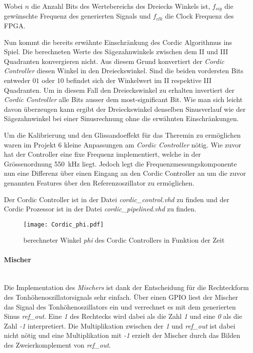 Wobei \(n\) die Anzahl Bits des Wertebereichs des Dreiecks Winkels ist, \(f_{sig}\) die gewünschte Frequenz des generierten Signals und \(f_{clk}\) die Clock Frequenz des FPGA.

Nun kommt die bereits erwähnte Einschränkung des Cordic Algorithmus ins Spiel. Die berechneten Werte des Sägezahnwinkels zwischen dem II und III Quadranten konvergieren nicht. Aus diesem Grund konvertiert der \textit{Cordic Controller} diesen Winkel in den Dreieckswinkel. Sind die beiden vordersten Bits entweder \(01\) oder \(10\) befindet sich der Winkelwert im II respektive III Quadranten. Um in diesem Fall den Dreieckswinkel zu erhalten invertiert der \textit{Cordic Controller} alle Bits ausser dem most-significant Bit. Wie man sich leicht davon überzeugen kann ergibt der Dreieckswinkel denselben Sinusverlauf wie der Sägezahnwinkel bei einer Sinusrechnung ohne die erwähnten Einschränkungen. \cite{Cordic}

Um die Kalibrierung und den Glissandoeffekt für das Theremin zu ermöglichen waren im Projekt 6 kleine Anpassungen am \textit{Cordic Controller} nötig. Wie zuvor hat der Controller eine fixe Frequenz implementiert, welche in der Grössenordnung \SI{550}{kHz} liegt. Jedoch legt die Frequenzmessungskomponente nun eine Differenz über einen Eingang an den Cordic Controller an um die zuvor genannten Features über den Referenzoszillator zu ermöglichen.

Der Cordic Controller ist in der Datei \textit{cordic\_control.vhd} zu finden und der Cordic Prozessor ist in der Datei \textit{cordic\_pipelined.vhd} zu finden.


\begin{figure}[t]
	\centering
	\texttt{[image: Cordic\_phi.pdf]}
	\caption{berechneter Winkel \textit{phi} des Cordic Controllers in Funktion der Zeit} 
	\label{img:Cordic_phi}
\end{figure}  


\paragraph{Mischer}\mbox{}\\

Die Implementation des \textit{Mischers} ist dank der Entscheidung für die Rechteckform des Tonhöhenoszillatorsignals sehr einfach. Über einen GPIO liest der Mischer das Signal des Tonhöhenoszillators ein und verrechnet es mit dem generierten Sinus \textit{ref\_out}. Eine \textit{1} des Rechtecks wird dabei als die Zahl \textit{1} und eine \textit{0} als die Zahl \textit{-1} interpretiert. Die Multiplikation zwischen der \textit{1} und \textit{ref\_out} ist dabei nicht nötig und eine Multiplikation mit \textit{-1} erzielt der Mischer durch das Bilden des Zweierkomplement von \textit{ref\_out}.

